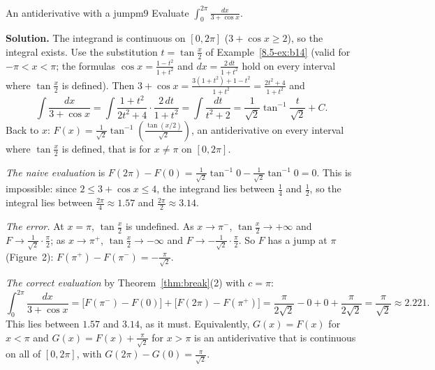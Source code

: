 \documentclass[11pt]{article}
\begin{document}
\begin{exmp}{An antiderivative with a jump}{m9}
Evaluate $\displaystyle\int_0^{2\pi}\frac{dx}{3+\cos x}$.

\textbf{Solution.} The integrand is continuous on $[0,2\pi]$ ($3+\cos x\ge2$), so the integral exists. Use the substitution $t=\tan\frac x2$ of Example~\ref{8.5-ex:b14} (valid for $-\pi<x<\pi$; the formulas $\cos x=\frac{1-t^2}{1+t^2}$ and $dx=\frac{2\,dt}{1+t^2}$ hold on every interval where $\tan\frac x2$ is defined). Then $3+\cos x=\frac{3(1+t^2)+1-t^2}{1+t^2}=\frac{2t^2+4}{1+t^2}$ and
\[\int\frac{dx}{3+\cos x}=\int\frac{1+t^2}{2t^2+4}\cdot\frac{2\,dt}{1+t^2}=\int\frac{dt}{t^2+2}=\frac1{\sqrt2}\tan^{-1}\frac t{\sqrt2}+C .\]
Back to $x$: $F(x)=\frac1{\sqrt2}\tan^{-1}\left(\frac{\tan(x/2)}{\sqrt2}\right)$, an antiderivative on every interval where $\tan\frac x2$ is defined, that is for $x\ne\pi$ on $[0,2\pi]$.

\emph{The naive evaluation} is $F(2\pi)-F(0)=\frac1{\sqrt2}\tan^{-1}0-\frac1{\sqrt2}\tan^{-1}0=0$. This is impossible: since $2\le3+\cos x\le4$, the integrand lies between $\frac14$ and $\frac12$, so the integral lies between $\frac{2\pi}4\approx1.57$ and $\frac{2\pi}2\approx3.14$.

\emph{The error.} At $x=\pi$, $\tan\frac x2$ is undefined. As $x\to\pi^-$, $\tan\frac x2\to+\infty$ and $F\to\frac1{\sqrt2}\cdot\frac\pi2$; as $x\to\pi^+$, $\tan\frac x2\to-\infty$ and $F\to-\frac1{\sqrt2}\cdot\frac\pi2$. So $F$ has a jump at $\pi$ (Figure~2): $F(\pi^+)-F(\pi^-)=-\frac\pi{\sqrt2}$.

\emph{The correct evaluation} by Theorem~\ref{thm:break}(2) with $c=\pi$:
\[\int_0^{2\pi}\frac{dx}{3+\cos x}=\big[F(\pi^-)-F(0)\big]+\big[F(2\pi)-F(\pi^+)\big]=\frac\pi{2\sqrt2}-0+0+\frac\pi{2\sqrt2}=\frac\pi{\sqrt2}\approx2.221 .\]
This lies between $1.57$ and $3.14$, as it must. Equivalently, $G(x)=F(x)$ for $x<\pi$ and $G(x)=F(x)+\frac\pi{\sqrt2}$ for $x>\pi$ is an antiderivative that is continuous on all of $[0,2\pi]$, with $G(2\pi)-G(0)=\frac\pi{\sqrt2}$.


\end{exmp}
\end{document}
